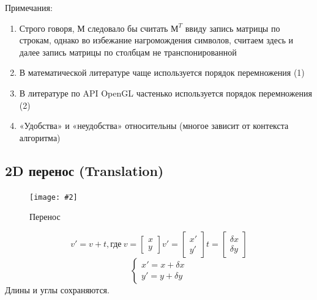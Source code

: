 \documentclass[a4paper, 14pt]{extarticle}
\newcommand{\screenshot}[3]{
	\begin{figure}[h]
		\centering
		\texttt{[image: \#2]}
		\caption{#3}
	\end{figure}
}
\begin{document}
Примечания:
\begin{enumerate}
	\item Строго говоря, $М$ следовало бы считать $М^T$ ввиду запись матрицы по строкам, однако во избежание нагромождения символов, считаем здесь и далее запись матрицы по столбцам не транспонированной
	\item В математической литературе чаще используется порядок перемножения (1)
	\item В литературе по API OpenGL частенько используется порядок перемножения (2)
	\item «Удобства» и «неудобства» относительны (многое зависит от контекста алгоритма) 
\end{enumerate}

\subsection{2D перенос (Translation)}
\screenshot{width=9cm}{l3/S005.jpg}{Перенос}
$$
v'=v+t, \textrm{где} \ 
v=\begin{bmatrix} x \\ y \end{bmatrix}
v'=\begin{bmatrix} x' \\ y' \end{bmatrix}
t=\begin{bmatrix} \delta x \\ \delta y \end{bmatrix}
$$
$$
\begin{cases}
	x'=x+\delta x\\
	y'=y+\delta y
\end{cases}
$$
Длины и углы сохраняются.
\end{document}

